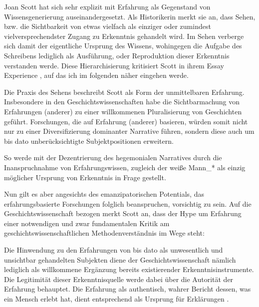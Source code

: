 Joan Scott hat sich sehr explizit mit Erfahrung als Gegenstand von
Wissensgenerierung auseinandergesetzt. Als Historikerin merkt sie an, dass
Sehen, bzw. die Sichtbarkeit von etwas vielfach als einziger oder zumindest
vielversprechendster Zugang zu Erkenntnis gehandelt wird. Im Sehen verberge
sich damit der eigentliche Ursprung des Wissens, wohingegen die Aufgabe des
Schreibens lediglich als Ausführung, oder Reproduktion dieser Erkenntnis
verstanden werde. Diese Hierarchisierung kritisiert Scott in ihrem Essay
\glqq Experience \grqq \footnotemark {}, auf das ich im folgenden näher eingehen werde.

Die Praxis des Sehens beschreibt Scott als Form der unmittelbaren Erfahrung.
Insbesondere in den Geschichtswissenschaften habe die Sichtbarmachung von
Erfahrungen (anderer) zu einer willkommenen  \glqq Pluralisierung von
Geschichten \grqq \footnotemark {} geführt. Forschungen, die auf Erfahrung (anderer) basieren, würden somit
nicht nur zu einer Diversifizierung dominanter Narrative führen, sondern diese
auch um bis dato unberücksichtigte Subjektpositionen erweitern. 
\footnotemark {} 

So werde mit
der Dezentrierung des hegemonialen Narratives durch die Inanspruchnahme von
Erfahrungswissen, zugleich der weiße Mann\_* als einzig möglicher Ursprung von
Erkenntnis in Frage gestellt. 

Nun gilt es aber angesichts des emanzipatorischen Potentials, das
erfahrungsbasierte Forschungen folglich beanspruchen, vorsichtig zu sein. Auf
die Geschichtswissenschaft bezogen merkt Scott an, dass der Hype um Erfahrung
einer notwendigen und zwar fundamentalen Kritik am geschichtswissenschaftlichen
Methodenverständnis im Wege steht: 

Die Hinwendung zu den Erfahrungen von bis
dato als unwesentlich und unsichtbar gehandelten Subjekten diene der
Geschichtswissenschaft nämlich lediglich als willkommene Ergänzung bereits
existierender Erkenntnisinstrumente. Die Legitimität dieser Erkenntnisquelle
werde dabei über die \glqq Autorität der Erfahrung \grqq \footnotemark
{} behauptet. Die Erfahrung als \glqq authentisch, wahrer
Bericht dessen, was ein Mensch erlebt hat, dient entsprechend als Ursprung für
Erklärungen \grqq. \footnotemark {} 

